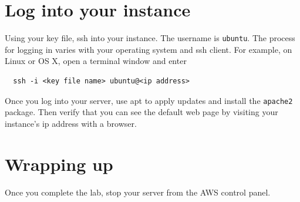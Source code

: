 \documentclass{article}
\begin{document}
\newpage

\section{Log into your instance}
Using your key file, ssh into your instance. The username is \texttt{ubuntu}. The process for logging in varies with your operating system and ssh client.  For example, on Linux or OS X, open a terminal window and enter

\begin{verbatim}
  ssh -i <key file name> ubuntu@<ip address>
\end{verbatim}

Once you log into your server, use apt to apply updates and install the \texttt{apache2} package.  Then verify that you can see the default web page by visiting your instance's ip address with a browser.

\section{Wrapping up}
Once you complete the lab, stop your server from the AWS control panel.
\end{document}
